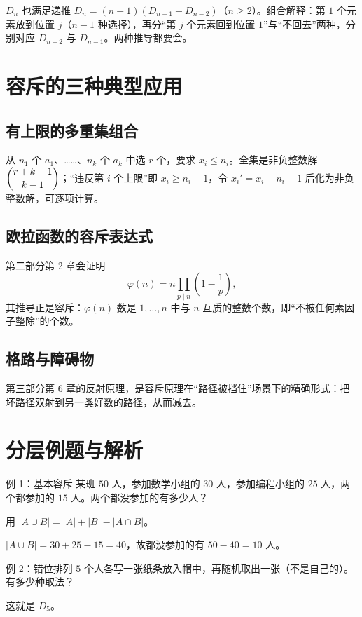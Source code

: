 \begin{tip}[错位排列的递推]
$D_n$ 也满足递推 $D_n=(n-1)(D_{n-1}+D_{n-2})$（$n\ge2$）。组合解释：第 $1$ 个元素放到位置 $j$（$n-1$ 种选择），再分“第 $j$ 个元素回到位置 $1$”与“不回去”两种，分别对应 $D_{n-2}$ 与 $D_{n-1}$。两种推导都要会。
\end{tip}

\section{容斥的三种典型应用}
\subsection{有上限的多重集组合}
从 $n_1$ 个 $a_1$、……、$n_k$ 个 $a_k$ 中选 $r$ 个，要求 $x_i\le n_i$。全集是非负整数解 $\dbinom{r+k-1}{k-1}$；“违反第 $i$ 个上限”即 $x_i\ge n_i+1$，令 $x_i'=x_i-n_i-1$ 后化为非负整数解，可逐项计算。

\subsection{欧拉函数的容斥表达式}
第二部分第 2 章会证明
\[
\varphi(n)=n\prod_{p\mid n}\left(1-\frac1p\right),
\]
其推导正是容斥：$\varphi(n)$ 数是 $1,\ldots,n$ 中与 $n$ 互质的整数个数，即“不被任何素因子整除”的个数。

\subsection{格路与障碍物}
第三部分第 6 章的反射原理，是容斥原理在“路径被挡住”场景下的精确形式：把坏路径双射到另一类好数的路径，从而减去。

\section{分层例题与解析}
\begin{problem}{例 1：基本容斥}
某班 $50$ 人，参加数学小组的 $30$ 人，参加编程小组的 $25$ 人，两个都参加的 $15$ 人。两个都没参加的有多少人？
\end{problem}
\hint 用 $|A\cup B|=|A|+|B|-|A\cap B|$。

\sol $|A\cup B|=30+25-15=40$，故都没参加的有 $50-40=10$ 人。

\begin{problem}{例 2：错位排列}
$5$ 个人各写一张纸条放入帽中，再随机取出一张（不是自己的）。有多少种取法？
\end{problem}
\hint 这就是 $D_5$。

